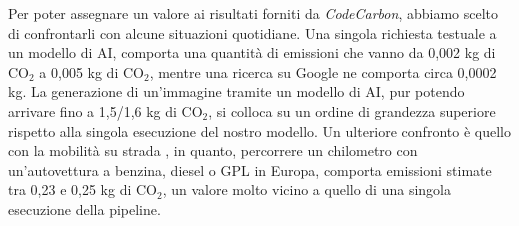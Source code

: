 \begin{flushleft}
Per poter assegnare un valore ai risultati forniti da \textit{CodeCarbon}, abbiamo scelto di confrontarli con alcune situazioni quotidiane. Una singola richiesta testuale a un modello di AI, comporta una quantità di emissioni che vanno da 0,002 kg di CO$_2$ a 0,005 kg di CO$_2$, mentre una ricerca su Google ne comporta circa 0,0002 kg. La generazione di un'immagine tramite un modello di AI, pur potendo arrivare fino a 1,5/1,6 kg di CO$_2$, si colloca su un ordine di grandezza superiore rispetto alla singola esecuzione del nostro modello. Un ulteriore confronto è quello con la mobilità su strada \cite{emissioni_auto} \cite{altre_emissioni}, in quanto, percorrere un chilometro con un'autovettura a benzina, diesel o GPL in Europa, comporta emissioni stimate tra 0,23 e 0,25 kg di CO$_2$, un valore molto vicino a quello di una singola esecuzione della pipeline.
\end{flushleft}